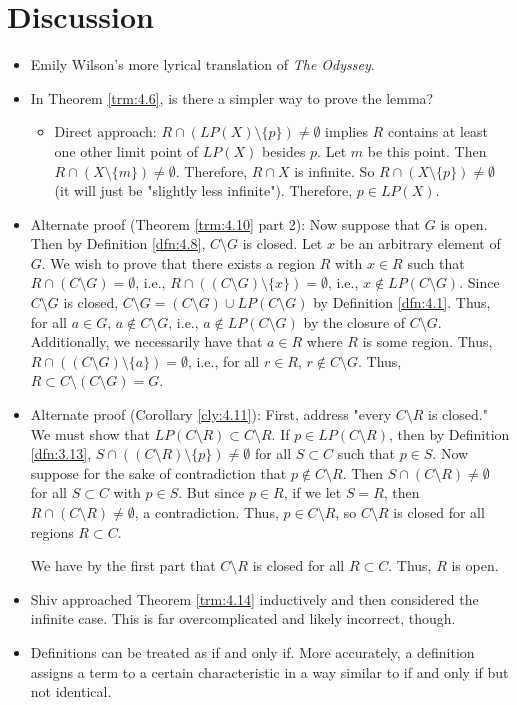 \documentclass[titlepage]{report}
\begin{document}
\section{Discussion}
\begin{itemize}
    \item {}Emily Wilson's more lyrical translation of \emph{The Odyssey}.
    \item {}In Theorem \ref{trm:4.6}, is there a simpler way to prove the lemma?
    \begin{itemize}
        \item Direct approach: $R\cap(LP(X)\setminus\{p\})\neq\emptyset$ implies $R$ contains at least one other limit point of $LP(X)$ besides $p$. Let $m$ be this point. Then $R\cap(X\setminus\{m\})\neq\emptyset$. Therefore, $R\cap X$ is infinite. So $R\cap(X\setminus\{p\})\neq\emptyset$ (it will just be "slightly less infinite"). Therefore, $p\in LP(X)$.
    \end{itemize}
    \item Alternate proof (Theorem \ref{trm:4.10} part 2): Now suppose that $G$ is open. Then by Definition \ref{dfn:4.8}, $C\setminus G$ is closed. Let $x$ be an arbitrary element of $G$. We wish to prove that there exists a region $R$ with $x\in R$ such that $R\cap(C\setminus G)=\emptyset$, i.e., $R\cap((C\setminus G)\setminus\{x\})=\emptyset$, i.e., $x\notin LP(C\setminus G)$. Since $C\setminus G$ is closed, $C\setminus G=(C\setminus G)\cup LP(C\setminus G)$ by Definition \ref{dfn:4.1}. Thus, for all $a\in G$, $a\notin C\setminus G$, i.e., $a\notin LP(C\setminus G)$ by the closure of $C\setminus G$. Additionally, we necessarily have that $a\in R$ where $R$ is some region. Thus, $R\cap((C\setminus G)\setminus\{a\})=\emptyset$, i.e., for all $r\in R$, $r\notin C\setminus G$. Thus, $R\subset C\setminus(C\setminus G)=G$.
    \item Alternate proof (Corollary \ref{cly:4.11}): First, address "every $C\setminus R$ is closed." We must show that $LP(C\setminus R)\subset C\setminus R$. If $p\in LP(C\setminus R)$, then by Definition \ref{dfn:3.13}, $S\cap((C\setminus R)\setminus\{p\})\neq\emptyset$ for all $S\subset C$ such that $p\in S$. Now suppose for the sake of contradiction that $p\notin C\setminus R$. Then $S\cap(C\setminus R)\neq\emptyset$ for all $S\subset C$ with $p\in S$. But since $p\in R$, if we let $S=R$, then $R\cap(C\setminus R)\neq\emptyset$, a contradiction. Thus, $p\in C\setminus R$, so $C\setminus R$ is closed for all regions $R\subset C$.\par
    We have by the first part that $C\setminus R$ is closed for all $R\subset C$. Thus, $R$ is open.
    \item Shiv approached Theorem \ref{trm:4.14} inductively and then considered the infinite case. This is far overcomplicated and likely incorrect, though.
    \item Definitions can be treated as if and only if. More accurately, a definition assigns a term to a certain characteristic in a way similar to if and only if but not identical.
\end{itemize}
\end{document}
